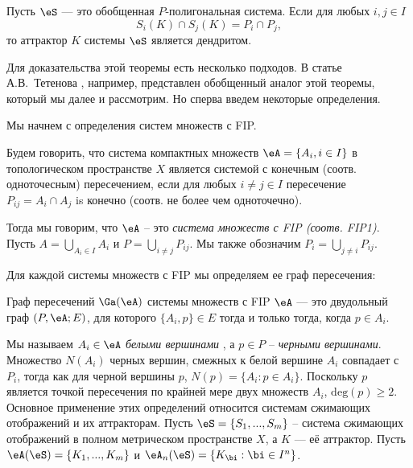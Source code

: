 \begin{theorem}\label{pcint}
Пусть $\eS$ --- это обобщенная $P$-полигональная система.  Если для любых $i, j \in I$ \begin{equation}\label{icnd}S_i(K)\cap S_j(K)=P_i\cap P_j,\end{equation} то аттрактор $K$ системы $\eS$ является дендритом.
\end{theorem}
 
Для доказательства этой теоремы есть несколько подходов. В статье А.В.~Тетенова \cite{FPS}, например, представлен обобщенный аналог этой теоремы, который мы далее и рассмотрим. Но сперва введем некоторые определения.

Мы начнем с определения систем множеств с FIP.
\begin{definition}\label{fipss}
Будем говорить, что система компактных множеств  $\eA=\{A_i,i\in I\}$ в топологическом пространстве $X$ является системой с конечным  (соотв. одноточесным) пересечением, если для любых  $i\neq j\in I $ пересечение $P_{ij}=A_i\cap A_j$ is конечно (соотв. не более чем одноточечно).\\
\end{definition}

Тогда мы говорим, что $\eA$ -- это {\em система множеств с  FIP (соотв. FIP1)}.\\ 
 
Пусть $A=\bigcup\limits_{A_i\in I}A_i$ и  $P=\bigcup\limits_{i\neq j}P_{ij} $. Мы также обозначим $P_i=\bigcup\limits_{j\neq i}P_{ij}$. 

Для каждой системы множеств с FIP мы определяем ее граф пересечения:
\begin{definition}\label{igraph}
Граф пересечений  $\Ga(\eA)$ системы множеств с FIP $\eA$ --- это двудольный граф  $(P,\eA; E)$, для которого  $\{A_i,p\}\in E$ тогда и только тогда, когда $p\in A_i$. 
\end{definition}

Мы называем $A_i\in \eA$ {\em белыми вершинами} , а $p\in P$ -- {\em черными вершинами}.  Множество $N(A_i)$ черных вершин, смежных к белой вершине $A_i$ совпадает с   $P_i$, тогда как для черной вершины $p$,  $N(p)=\{A_i:p\in A_i\}$. Поскольку $p$ является точкой пересечения по крайней мере двух множеств $A_i$, \quad $ \mathrm{deg}(p)\ge 2$.\\
 
Основное применение этих определений относится системам сжимающих отображений и их аттракторам.
Пусть $\eS=\{S_1,...,S_m\}$ -- система сжимающих отображений в полном метрическом пространстве $X$, а $K$ --- её аттрактор. Пусть $\eA(\eS)=\{K_1,..., K_m\}$ и $\eA_n(\eS)=\{K_\bi:\bi\in I^n\}$.
 
